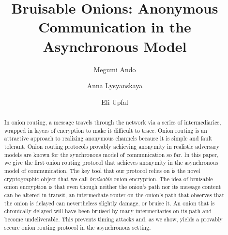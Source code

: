 \documentclass[runningheads,a4paper]{llncs}
\begin{document}
%
\title{Bruisable Onions: Anonymous Communication in the Asynchronous Model}
%
%
\author{
Megumi Ando
\and
Anna Lysyanskaya%
\and
Eli Upfal}
%
%
%
\maketitle              %
%
\begin{abstract}
In onion routing, a message travels through the network via a series of intermediaries, wrapped in layers of encryption to make it difficult to trace.
%
Onion routing is an attractive approach to realizing anonymous channels because it is simple and fault tolerant.
%
Onion routing protocols provably achieving anonymity in realistic adversary models are known for the synchronous model of communication so far.
%
In this paper, we give the first onion routing protocol that achieves anonymity in the asynchronous model of communication.
%
The key tool that our protocol relies on is the novel cryptographic object that we call \textit{bruisable} onion encryption.
%
The idea of bruisable onion encryption is that even though neither the onion's path nor its message content can be altered in transit, an intermediate router on the onion's path that observes that the onion is delayed can nevertheless slightly damage, or bruise it.  An onion that is chronically delayed will have been bruised by many intermediaries on its path and become undeliverable.  This prevents timing attacks and, as we show, yields a provably secure onion routing protocol in the asynchronous setting. 
\end{abstract}
%
%
%
\newcommand{\parties}{\mathsf{Parties}}
\newcommand{\keygen}{\mathsf{KeyGen}}
\newcommand{\formonion}{\mathsf{FormOnion}}
\newcommand{\proconion}{\mathsf{PeelOnion}}
\newcommand{\proconionhelper}{\mathsf{PeelOnionHelper}}
\newcommand{\bruiseonion}{\mathsf{BruiseOnion}}
\newcommand{\polylog}{\mathsf{polylog}}
\newcommand{\early}{\mathsf{early}}
\newcommand{\late}{\mathsf{late}}
\newcommand{\recipient}{\mathsf{Recipient}}
\newcommand{\Bad}{\mathsf{Bad}}
\end{document}
